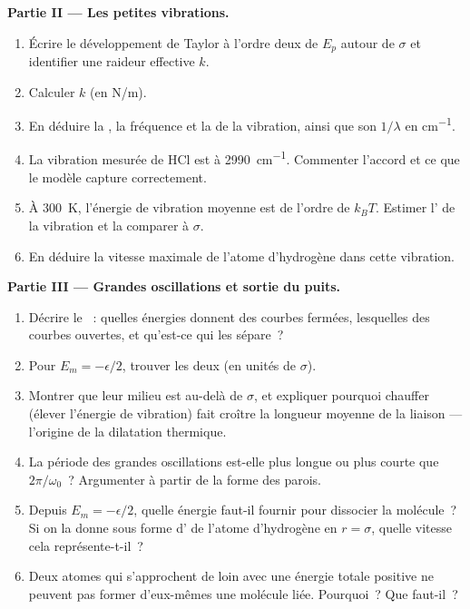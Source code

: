 \begin{problem}
\medskip
\noindent\textbf{Partie II --- Les petites vibrations.}
\begin{enumerate}[resume]
  \item Écrire le développement de Taylor à l'ordre deux de $E_p$ autour
        de $\sigma$ et identifier une raideur effective $k$.
  \item Calculer $k$ (en \unit{N/m}).
  \item En déduire la , la fréquence et la  de
        la vibration, ainsi que son  $1/\lambda$ en \unit{cm^{-1}}.
  \item La vibration mesurée de HCl est à \qty{2990}{cm^{-1}}. Commenter
        l'accord et ce que le modèle capture correctement.
  \item À \qty{300}{K}, l'énergie de vibration moyenne est de l'ordre de
        $k_BT$. Estimer l' de la vibration et la comparer à $\sigma$.
  \item En déduire la vitesse maximale de l'atome d'hydrogène dans cette
        vibration.
\end{enumerate}

\medskip
\noindent\textbf{Partie III --- Grandes oscillations et sortie du puits.}
\begin{enumerate}[resume]
  \item Décrire le ~: quelles énergies donnent des
        courbes fermées, lesquelles des courbes ouvertes, et qu'est-ce
        qui les sépare~?
  \item Pour $E_m = -\epsilon/2$, trouver les deux  (en unités de $\sigma$).
  \item Montrer que leur milieu est au-delà de $\sigma$, et expliquer
        pourquoi chauffer (élever l'énergie de vibration) fait croître la
        longueur moyenne de la liaison --- l'origine de la dilatation
        thermique.
  \item La période des grandes oscillations est-elle plus longue ou plus
        courte que $2\pi/\omega_0$~? Argumenter à partir de la forme des
        parois.
  \item Depuis $E_m = -\epsilon/2$, quelle énergie faut-il fournir pour
        dissocier la molécule~? Si on la donne sous forme d' de l'atome d'hydrogène en $r = \sigma$, quelle vitesse
        cela représente-t-il~?
  \item Deux atomes qui s'approchent de loin avec une énergie totale
        positive ne peuvent pas former d'eux-mêmes une molécule liée.
        Pourquoi~? Que faut-il~?
\end{enumerate}


\end{problem}
